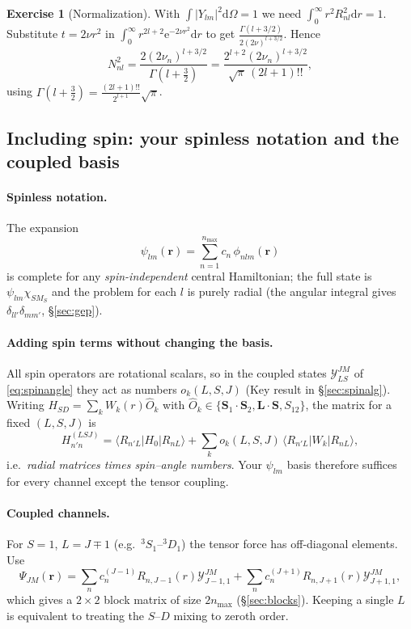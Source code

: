 \documentclass[11pt,a4paper]{article}
\numberwithin{equation}{section}
\theoremstyle{definition}
\newtheorem{exercise}[definition]{Exercise}
\theoremstyle{plain}
\theoremstyle{remark}
\numberwithin{algorithm}{section}
\newcommand{\vr}{\bm r}
\newcommand{\vL}{\bm L}
\newcommand{\vS}{\bm S}
\newcommand{\dd}{\mathrm{d}}
\newcommand{\ee}{\mathrm{e}}
\newcommand{\ME}[3]{\langle #1|#2|#3\rangle}
\newcommand{\SY}{\mathcal Y}
\begin{document}
\begin{exercise}[Normalization]
With $\int|Y_{lm}|^2\dd\Omega=1$ we need $\int_0^\infty r^2R_{nl}^2\dd r=1$. Substitute $t=2\nu r^2$ in $\int_0^\infty r^{2l+2}\ee^{-2\nu r^2}\dd r$ to get $\frac{\Gamma(l+3/2)}{2(2\nu)^{l+3/2}}$. Hence
\begin{equation}
N_{nl}^2=\frac{2(2\nu_n)^{l+3/2}}{\Gamma(l+\frac32)}=\frac{2^{l+2}(2\nu_n)^{l+3/2}}{\sqrt\pi\,(2l+1)!!},
\end{equation}
using $\Gamma(l+\frac32)=\frac{(2l+1)!!}{2^{l+1}}\sqrt\pi$.
\end{exercise}

\subsection{Including spin: your spinless notation and the coupled basis}\label{sec:spinbasis}
\paragraph{Spinless notation.} The expansion
\begin{equation}
\psi_{lm}(\vr)=\sum_{n=1}^{n_{\max}}c_n\,\phi_{nlm}(\vr)
\label{eq:spinless}
\end{equation}
is complete for any \emph{spin-independent} central Hamiltonian; the full state is $\psi_{lm}\chi_{SM_S}$ and the problem for each $l$ is purely radial (the angular integral gives $\delta_{ll'}\delta_{mm'}$, \S\ref{sec:gep}).

\paragraph{Adding spin terms without changing the basis.} All spin operators are rotational scalars, so in the coupled states $\SY^{JM}_{LS}$ of \eqref{eq:spinangle} they act as numbers $o_k(L,S,J)$ (Key result in \S\ref{sec:spinalg}). Writing $H_{SD}=\sum_kW_k(r)\hat O_k$ with $\hat O_k\in\{\vS_1\!\cdot\!\vS_2,\vL\!\cdot\!\vS,S_{12}\}$, the matrix for a fixed $(L,S,J)$ is
\begin{equation}
H_{n'n}^{(LSJ)}=\ME{R_{n'L}}{H_0}{R_{nL}}+\sum_ko_k(L,S,J)\,\ME{R_{n'L}}{W_k}{R_{nL}},
\end{equation}
i.e.\ \emph{radial matrices times spin--angle numbers}. Your $\psi_{lm}$ basis therefore suffices for every channel except the tensor coupling.

\paragraph{Coupled channels.} For $S=1$, $L=J\mp1$ (e.g.\ ${}^3S_1$--${}^3D_1$) the tensor force has off-diagonal elements. Use
\begin{equation}
\Psi_{JM}(\vr)=\sum_{n}c^{(J-1)}_n R_{n,J-1}(r)\SY^{JM}_{J-1,1}+\sum_nc^{(J+1)}_nR_{n,J+1}(r)\SY^{JM}_{J+1,1},
\end{equation}
which gives a $2\times2$ block matrix of size $2n_{\max}$ (\S\ref{sec:blocks}). Keeping a single $L$ is equivalent to treating the $S$--$D$ mixing to zeroth order.
\end{document}

